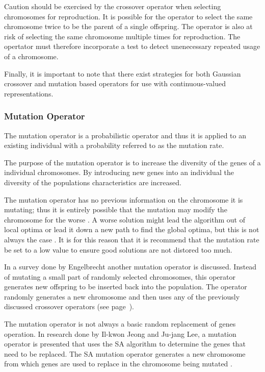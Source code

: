 Caution should be exercised by the crossover operator when selecting chromosomes for reproduction. It is possible for the operator to select the same chromosome twice to be the parent of a single offspring\cite{CompuIntelligenceIntro}. The operator is also at risk of selecting the same chromosome multiple times for reproduction\cite{CompuIntelligenceIntro}. The opertator must therefore incorporate a test to detect unenecessary repeated usage of a chromosome\cite{CompuIntelligenceIntro}.

Finally, it is important to note that there exist strategies for both Gaussian crossover and mutation based operators for use with continuous-valued representations\cite{FundamentalSwarm}.

\subsubsection{Mutation Operator}
The mutation operator is a probabilistic operator and thus it is applied to an existing individual with a probability referred to as the mutation rate\cite{CompuIntelligenceIntro}. 

The purpose of the mutation operator is to increase the diversity of the genes of a individual chromosomes\cite{CompuIntelligenceIntro}. By introducing new genes into an individual the diversity of the populations characteristics are increased\cite{CoactiveFuzzyGA,AcceleratingGA,ConstrainedGA}.

The mutation operator has no previous information on the chromosome it is mutating; thus it is entirely possible that the mutation may modify the chromosome for the worse \cite{AcceleratingGA}. A worse solution might lead the algorithm out of local optima or lead it down a new path to find the global optima, but this is not always the case \cite{AdaptiveSAGA,FamilyGA,ConstrainedGA}. It is for this reason that it is recommend that the mutation rate be set to a low value to ensure good solutions are not distored too much\cite{CompuIntelligenceIntro}.

In a survey done by Engelbrecht\cite{CompuIntelligenceIntro} another mutation operator is discussed. Instead of mutating a small part of randomly selected chromosomes, this operator generates new offspring to be inserted back into the population. The operator randomly generates a new chromosome and then uses any of the previously discussed crossover operators (see page~\pageref{sec:crossover}).

The mutation operator is not always a basic random replacement of genes operation. In research done by Il-kwon Jeong and Ju-jang Lee\cite{AdaptiveSAGA}, a mutation operator is presented that uses the SA algorithm to determine the genes that need to be replaced. The SA mutation operator generates a new chromosome from which genes are used to replace in the chromosome being mutated \cite{AdaptiveSAGA}.

